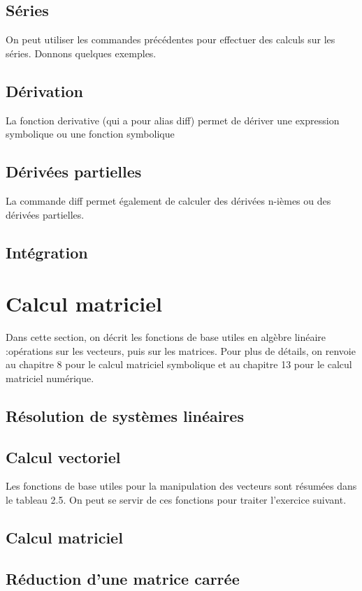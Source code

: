  \subsection{Séries}
  On peut utiliser les commandes précédentes pour effectuer des calculs sur les séries. Donnons quelques exemples.
 \subsection{Dérivation}
 La fonction derivative (qui a pour alias diff) permet de dériver une expression symbolique ou une fonction symbolique
 \subsection{Dérivées partielles}
 La commande diff permet également de calculer des dérivées n-ièmes ou des dérivées partielles.
 \subsection{Intégration}
 \section{Calcul matriciel}
  Dans cette section, on décrit les fonctions de base utiles en algèbre linéaire :opérations sur les vecteurs, puis sur les matrices. Pour plus de détails, on renvoie au chapitre 8 pour le calcul matriciel symbolique et au chapitre 13 pour le calcul matriciel numérique.
  \subsection{Résolution de systèmes linéaires}
  \subsection{Calcul vectoriel}
  Les fonctions de base utiles pour la manipulation des vecteurs sont résumées dans le tableau 2.5. On peut se servir de ces fonctions pour traiter l'exercice suivant.
  \subsection{Calcul matriciel} 
  \subsection{Réduction d'une matrice carrée}
